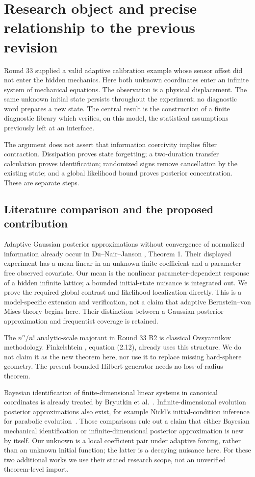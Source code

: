 \section{Research object and precise relationship to the previous revision}
\label{sec:r35-scope}
Round 33 supplied a valid adaptive calibration example whose sensor offset did not enter the hidden mechanics. Here both unknown coordinates enter an infinite system of mechanical equations. The observation is a physical displacement. The same unknown initial state persists throughout the experiment; no diagnostic word prepares a new state. The central result is the construction of a finite diagnostic library which verifies, on this model, the statistical assumptions previously left at an interface.

The argument does not assert that information coercivity implies filter contraction. Dissipation proves state forgetting; a two-duration transfer calculation proves identification; randomized signs remove cancellation by the existing state; and a global likelihood bound proves posterior concentration. These are separate steps.

\subsection{Literature comparison and the proposed contribution}
Adaptive Gaussian posterior approximations without convergence of normalized information already occur in Du--Nair--Janson \cite{DNJ}, Theorem 1. Their displayed experiment has a mean linear in an unknown finite coefficient and a parameter-free observed covariate. Our mean is the nonlinear parameter-dependent response of a hidden infinite lattice; a bounded initial-state nuisance is integrated out. We prove the required global contrast and likelihood localization directly. This is a model-specific extension and verification, not a claim that adaptive Bernstein--von Mises theory begins here. Their distinction between a Gaussian posterior approximation and frequentist coverage is retained.

The $n^n/n!$ analytic-scale majorant in Round 33 B2 is classical Ovsyannikov methodology. Finkelshtein \cite{Finkelshtein}, equation (2.12), already uses this structure. We do not claim it as the new theorem here, nor use it to replace missing hard-sphere geometry. The present bounded Hilbert generator needs no loss-of-radius theorem.

Bayesian identification of finite-dimensional linear systems in canonical coordinates is already treated by Bryutkin et al.~\cite{Canonical}. Infinite-dimensional evolution posterior approximations also exist, for example Nickl's initial-condition inference for parabolic evolution~\cite{Nickl}. Those comparisons rule out a claim that either Bayesian mechanical identification or infinite-dimensional posterior approximation is new by itself. Our unknown is a local coefficient pair under adaptive forcing, rather than an unknown initial function; the latter is a decaying nuisance here. For these two additional works we use their stated research scope, not an unverified theorem-level import.

